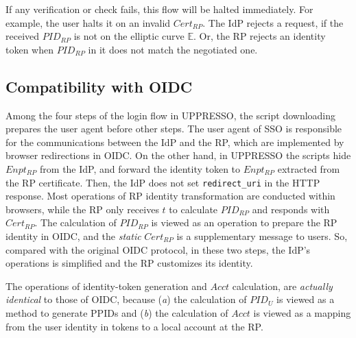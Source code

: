 If any verification or check fails,
     this flow will be halted immediately.
For example, the user halts it
    on an invalid $Cert_{RP}$.
The IdP rejects a request, if the received $PID_{RP}$ is not on the elliptic curve $\mathbb{E}$.
Or, the RP rejects an identity token
    when $PID_{RP}$ in it does not match the negotiated one.



\subsection{Compatibility with OIDC}
\label{subsec:compatible}

Among the four steps of the login flow in UPPRESSO,
    the script downloading prepares the user agent before other steps.
The user agent of SSO is responsible for the communications between the IdP and the RP,
    which are implemented by browser redirections in OIDC.
On the other hand, in UPPRESSO the scripts hide $Enpt_{RP}$ from the IdP,
    and forward the identity token to $Enpt_{RP}$ extracted from the RP certificate.
Then, the IdP does not set \verb+redirect_uri+ in the HTTP response. %
Most operations of RP identity transformation are conducted within browsers,
 while the RP only receives $t$ to calculate $PID_{RP}$ and responds with  $Cert_{RP}$.
The calculation of $PID_{RP}$ is viewed as an operation to prepare the RP identity in OIDC,
    and the \emph{static} $Cert_{RP}$ is a supplementary message to users.
So, compared with the original OIDC protocol, in these two steps, the IdP's operations is simplified
    and the RP customizes its identity.

The operations of identity-token generation and $Acct$ calculation,
    are \emph{actually identical} to those of OIDC,
    because (\emph{a}) the calculation of $PID_U$ is viewed as a method to generate PPIDs
        and (\emph{b}) the calculation of $Acct$ is viewed as a mapping from the user identity in tokens
                    to a local account at the RP.

